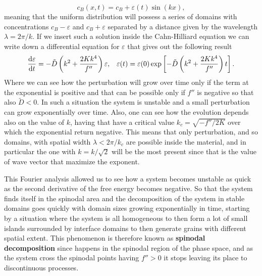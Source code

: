 \begin{equation}
    c_B (x, t) = c_B + \varepsilon(t)\sin(kx),
\end{equation}
meaning that the uniform distribution will possess a series of domains with concentrations $c_B -\varepsilon$ and $c_B + \varepsilon$ separated by a distance given by the wavelength $\lambda = 2\pi/k$. If we insert such a solution inside the Cahn-Hilliard equation we can write down a differential equation for $\varepsilon$ that gives out the following result
\begin{align}
    \label{eq:PertAnalConserv}
    &\dv{\varepsilon}{t} = -\tilde{D}\left( k^2 + \frac{2Kk^4}{f''} \right)\varepsilon, &\varepsilon(t) =\varepsilon(0) \exp\left[ -\tilde{D}\left( k^2 + \frac{2Kk^4}{f''} \right) t \right]. 
\end{align}
Where we can see how the perturbation will grow over time only if the term at the exponential is positive and that can be possible only if $f''$ is negative so that also $\tilde{D} < 0$. In such a situation the system is unstable and a small perturbation can grow exponentially over time. Also, one can see how the evolution depends also on the value of $k$, having that have a critical value $k_c = \sqrt{-f''/2K}$ over which the exponential return negative. This means that only perturbation, and so domains, with spatial width $\lambda < 2\pi/k_c$ are possible inside the material, and in particular the one with $k = k/\sqrt{2}$ will be the most present since that is the value of wave vector that maximize the exponent.

This Fourier analysis allowed us to see how a system becomes unstable as quick as the second derivative of the free energy becomes negative. So that the system finds itself in the spinodal area and the decomposition of the system in stable domains goes quickly with domain sizes growing exponentially in time, starting by a situation where the system is all homogeneous to then form a lot of small islands surrounded by interface domains to then generate grains with different spatial extent. This phenomenon is therefore known as \textbf{spinodal decomposition} since happens in the spinodal region of the phase space, and as the system cross the spinodal points having $f'' > 0$ it stops leaving its place to discontinuous processes.

